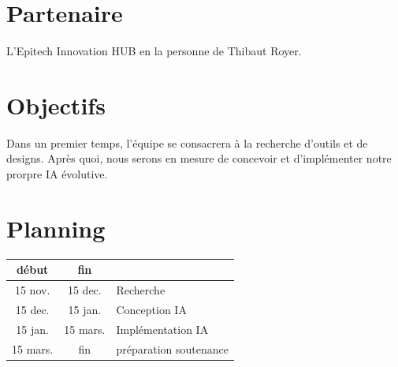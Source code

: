 \documentclass[a4paper]{report}
\begin{document}
  \section*{Partenaire}
  L'Epitech Innovation HUB en la personne de Thibaut Royer.

  \section*{Objectifs}
  Dans un premier temps, l'\'equipe se consacrera à la recherche d'outils et de designs.
  Après quoi, nous serons en mesure de concevoir et d'impl\'ementer notre prorpre IA \'evolutive.

  \section*{Planning}
  \begin{tabular}{c c|l}
    \hline
      d\'ebut & fin & \\
    \hline
      15 nov. & 15 dec. & Recherche \\
      15 dec. & 15 jan. & Conception IA \\
      15 jan. & 15 mars. & Impl\'ementation IA \\
      15 mars. & fin & pr\'eparation soutenance\\
    \hline
  \end{tabular}
\end{document}
